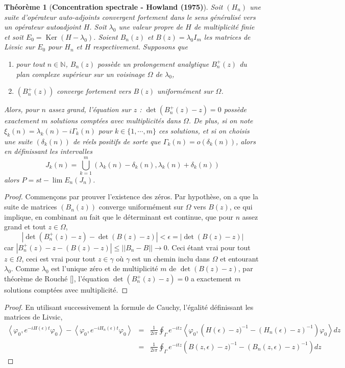 \documentclass[12pt,openany,a4paper, titlepage]{article}
\newcommand{\f}[2]{\frac{#1}{#2}}
\newcommand{\lp}{\left(}
\newcommand{\rp}{\right)}
\newcommand{\la}{\left\langle}
\newcommand{\ra}{\right\rangle}
\newcommand{\N}{\mathbb{N}}
\newcommand{\Ker}{\operatorname{Ker}}
\newtheorem{theo}{Théorème}
\theoremstyle{definition}
\theoremstyle{definition}
\theoremstyle{definition}
\theoremstyle{definition}
\theoremstyle{definition}
\theoremstyle{definition}
\begin{document}
\begin{theo}[\textbf{Concentration spectrale - Howland (1975)}]
Soit $(H_n)$ une suite d'opérateur auto-adjoints convergent fortement dans le sens généralisé vers un opérateur autoadjoint $H$. Soit $\lambda_0$ une valeur propre de $H$ de multiplicité finie et soit $E_0 = \Ker(H -\lambda_0)$. Soient $B_n(z)$  et $B(z) = \lambda_0 I_m$ les matrices de Livsic sur $E_0$ pour $H_n$ et $H$ respectivement. 
Supposons que \begin{enumerate}
    \item[(1)] pour tout $n\in\N$, $B_n(z)$ possède un prolongement analytique $B_n^+(z)$ du plan complexe supérieur sur un voisinage $ \Omega$ de $\lambda_0$,
    \item[(2)] $\lp B_n^+(z)\rp$ converge fortement vers $B(z)$ uniformément sur $\Omega$.
\end{enumerate}
Alors, pour $n$ assez grand, l'équation sur $z$ : $\det(B_n^+(z) -z) = 0 $ possède exactement $m$ solutions comptées avec multiplicités dans $\Omega$. De plus, si on note $\xi_k(n) = \lambda_k(n) - i \Gamma_k(n)$ pour $k\in\{1,\cdots,m\}$ ces solutions, et si on choisis une suite $(\delta_k(n))$ de réels positifs de sorte que $\Gamma_k(n) = o(\delta_k(n))$, alors en définissant les intervalles 
$$ J_k(n) = \bigcup_{k=1}^m (\lambda_k(n) - \delta_k(n),\lambda_k(n) + \delta_k(n))$$ alors $P = st-\lim E_n(J_n)$.
\end{theo}

\begin{proof}
Commençons par prouver l'existence des zéros. Par hypothèse, on a que la suite de matrices $(B_n(z))$ converge uniformément sur $\Omega$ vers $B(z)$, ce qui implique, en combinant au fait que le déterminant est continue, que pour $n$ assez grand et tout $z\in\Omega$, $$ |\det (B_n^+(z) - z) - \det (B(z) - z)| < \epsilon = |\det (B(z) - z)| $$ car $|B_n^+(z) - z - (B(z) - z)| \leq ||B_n - B|| \rightarrow 0$. Ceci étant vrai pour tout $z\in\Omega$, ceci est vrai pour tout $z\in\gamma$ où $\gamma$ est un chemin inclu dans $\Omega$ et entourant $\lambda_0$. Comme $\lambda_0$ est l'unique zéro et de multiplicité $m$ de $\det (B(z) - z)$, par théorème de Rouché [], l'équation $\det(B_n^+(z) -z) = 0$ a exactement $m$ solutions comptées avec multiplicité.

\end{proof}

\newpage

\begin{proof}
En utilisant successivement la formule de Cauchy, l'égalité définissant les matrices de Livsic, 
\begin{eqnarray*}
\la \varphi_0,e^{-iH(\epsilon)t}\varphi_0 \ra - \la\varphi_0,e^{-iH_n(\epsilon)t}\varphi_0 \ra &=& \f{1}{2i\pi}\oint_\Gamma e^{-itz}\la \varphi_0,\lp H(\epsilon) -z)^{-1} - (H_n(\epsilon)-z)^{-1} \rp \varphi_0 \ra dz\\
&=& \f{1}{2i\pi}\oint_\Gamma e^{-itz} \lp B(z,\epsilon) -z)^{-1} - (B_n(z,\epsilon)-z)^{-1} \rp dz
\end{eqnarray*}
\end{proof}
\end{document}
